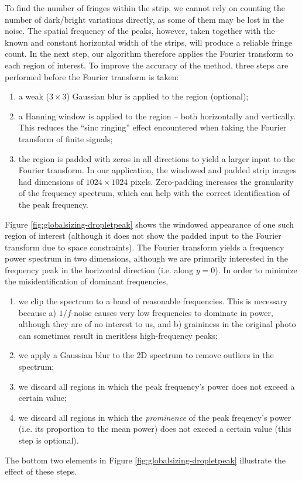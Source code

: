 \documentclass[10pt]{book}
\begin{document}
To find the number of fringes within the strip, we cannot rely on counting the
number of dark/bright variations directly, as some of them may be lost in the
noise. The spatial frequency of the peaks, however, taken together with the
known and constant horizontal width of the strips, will produce a reliable
fringe count. In the next step, our algorithm therefore applies the Fourier
transform to each region of interest. To improve the accuracy of the method,
three steps are performed before the Fourier transform is taken:
\begin{enumerate}
    \item a weak ($3 \times 3$) Gaussian blur is applied to the region
        (optional);
    \item a Hanning window is applied to the region -- both horizontally and
        vertically. This reduces the ``sinc ringing'' effect encountered when
        taking the Fourier transform of finite signals;
    \item the region is padded with zeros in all directions to yield a larger
        input to the Fourier transform. In our application, the windowed and padded strip
        images had dimensions of $1024 \times 1024$ pixels. Zero-padding
        increases the granularity of the frequency spectrum, which can help with
        the correct identification of the peak frequency.
\end{enumerate}

Figure \ref{fig:globalsizing-dropletpeak} shows the windowed appearance of
one such region of interest (although it does not show the padded input to the
Fourier transform due to space constraints). The Fourier transform yields a
frequency power spectrum in two dimensions, although we are primarily interested
in the frequency peak in the horizontal direction (i.e. along $y=0$). In order
to minimize the misidentification of dominant frequencies,
\begin{enumerate}
    \item we clip the spectrum to a band of reasonable frequencies. This is
        necessary because a) $1/f$-noise causes very low frequencies to dominate
        in power, although they are of no interest to us, and b) graininess in
        the original photo can sometimes result in meritless high-frequency
        peaks;
    \item we apply a Gaussian blur to the 2D spectrum to remove outliers in the
        spectrum;
    \item we discard all regions in which the peak frequency's power does not
        exceed a certain value;
    \item we discard all regions in which the \textit{prominence} of the peak
        freqency's power (i.e. its proportion to the mean power) does not exceed
        a certain value (this step is optional).
\end{enumerate}
The bottom two elements in Figure \ref{fig:globalsizing-dropletpeak} illustrate
the effect of these steps.
\end{document}
